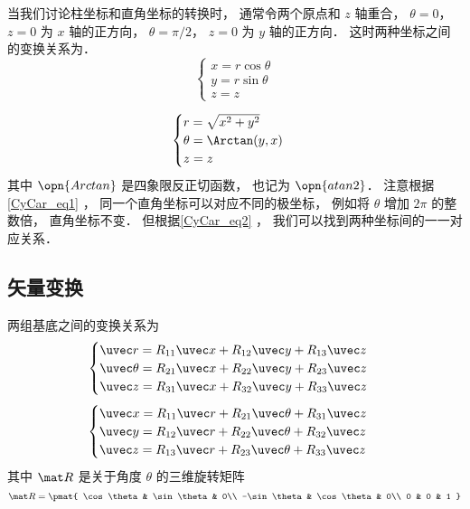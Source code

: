 

当我们讨论柱坐标和直角坐标的转换时， 通常令两个原点和 $z$ 轴重合， $\theta = 0$， $z = 0$ 为 $x$ 轴的正方向， $\theta = \pi/2$， $z = 0$ 为 $y$ 轴的正方向． 这时两种坐标之间的变换关系为．
\begin{equation}\label{CyCar_eq1}
\begin{cases}
x = r\cos \theta \\
y = r\sin \theta  \\
z = z 
\end{cases}
\end{equation}

\begin{equation}\label{CyCar_eq2}
\begin{cases}
r = \sqrt{x^2+y^2} \\
\theta = \Arctan(y,x)  \\
z = z 
\end{cases}
\end{equation}
其中 $\opn{Arctan}$ 是四象限反正切函数， 也记为 $\opn{atan2}$． 注意根据\autoref{CyCar_eq1} ， 同一个直角坐标可以对应不同的极坐标， 例如将 $\theta$ 增加 $2\pi$ 的整数倍， 直角坐标不变． 但根据\autoref{CyCar_eq2} ， 我们可以找到两种坐标间的一一对应关系．


\subsection{矢量变换}
两组基底之间的变换关系为
\begin{equation}\label{CyCar_eq3}
\begin{cases}
\uvec r = R_{11}\uvec x + R_{12}\uvec y + R_{13}\uvec z\\
\uvec \theta = R_{21}\uvec x + R_{22}\uvec y + R_{23}\uvec z\\
\uvec z = R_{31}\uvec x + R_{32}\uvec y + R_{33}\uvec z
\end{cases}
\end{equation}
\begin{equation}\label{CyCar_eq4}
\begin{cases}
\uvec x = R_{11} \uvec r + R_{21} \uvec \theta  + R_{31} \uvec z \\
\uvec y = R_{12} \uvec r + R_{22} \uvec \theta  + R_{32} \uvec z \\
\uvec z = R_{13} \uvec r + R_{23} \uvec \theta  + R_{33} \uvec z
\end{cases}
\end{equation}
其中 $\mat R$ 是关于角度 $\theta$ 的三维旋转矩阵
\begin{equation}
\mat R = \pmat{
    \cos\theta & \sin\theta & 0\\
    -\sin\theta & \cos\theta & 0\\
    0 & 0 & 1
}
\end{equation}

